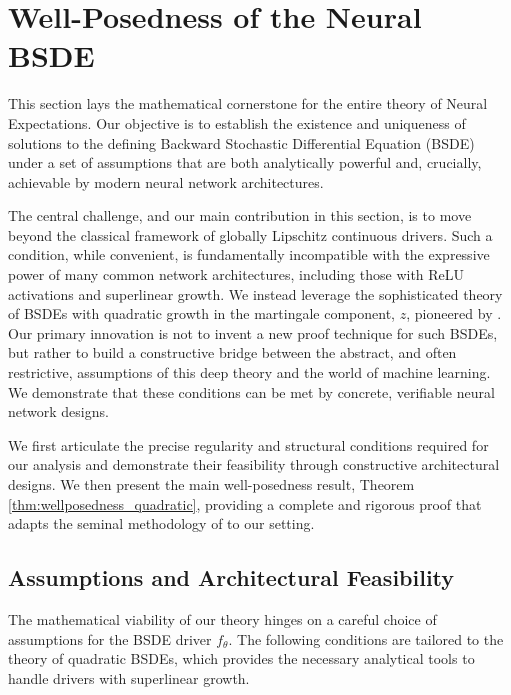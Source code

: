 \documentclass[qian]{imsart}
\theoremstyle{plain}
\theoremstyle{definition}
\begin{document}
\section{Well-Posedness of the Neural BSDE}
\label{sec:wellposedness}

This section lays the mathematical cornerstone for the entire theory of Neural Expectations. Our objective is to establish the existence and uniqueness of solutions to the defining Backward Stochastic Differential Equation (BSDE) under a set of assumptions that are both analytically powerful and, crucially, achievable by modern neural network architectures.

The central challenge, and our main contribution in this section, is to move beyond the classical framework of globally Lipschitz continuous drivers. Such a condition, while convenient, is fundamentally incompatible with the expressive power of many common network architectures, including those with ReLU activations and superlinear growth. We instead leverage the sophisticated theory of BSDEs with quadratic growth in the martingale component, $z$, pioneered by \cite{Kobylanski2000}. Our primary innovation is not to invent a new proof technique for such BSDEs, but rather to build a constructive bridge between the abstract, and often restrictive, assumptions of this deep theory and the world of machine learning. We demonstrate that these conditions can be met by concrete, verifiable neural network designs.

We first articulate the precise regularity and structural conditions required for our analysis and demonstrate their feasibility through constructive architectural designs. We then present the main well-posedness result, Theorem \ref{thm:wellposedness_quadratic}, providing a complete and rigorous proof that adapts the seminal methodology of \cite{Kobylanski2000} to our setting.

\subsection{Assumptions and Architectural Feasibility}
\label{sec:regularity}

The mathematical viability of our theory hinges on a careful choice of assumptions for the BSDE driver $f_\theta$. The following conditions are tailored to the theory of quadratic BSDEs, which provides the necessary analytical tools to handle drivers with superlinear growth.
\end{document}
